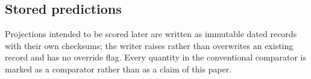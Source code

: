 \subsection*{Stored predictions}

Projections intended to be scored later are written as immutable dated records
with their own checksums; the writer raises rather than overwrites an existing
record and has no override flag. Every quantity in the conventional comparator
is marked as a comparator rather than as a claim of this paper.
